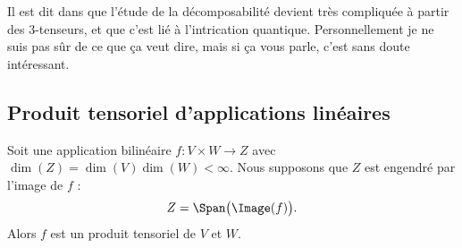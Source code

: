 \begin{normaltext}
	Il est dit dans \cite{BIBooDEEYooRGFyDD} que l'étude de la décomposabilité devient très compliquée à partir des \( 3\)-tenseurs, et que c'est lié à l'intrication quantique. Personnellement je ne suis pas sûr de ce que ça veut dire, mais si ça vous parle, c'est sans doute intéressant.
\end{normaltext}


\subsection{Produit tensoriel d'applications linéaires}


\begin{proposition}		\label{PROPooKNNJooLSqzlD}
	Soit une application bilinéaire \(f \colon V\times W\to Z  \) avec \( \dim(Z)=\dim(V)\dim(W)<\infty\). Nous supposons que \( Z\) est engendré par l'image de \( f\) :
	\begin{equation}
		Z=\Span\big( \Image(f) \big).
	\end{equation}
	Alors \( f\) est un produit tensoriel de \( V\) et \( W\).
\end{proposition}

